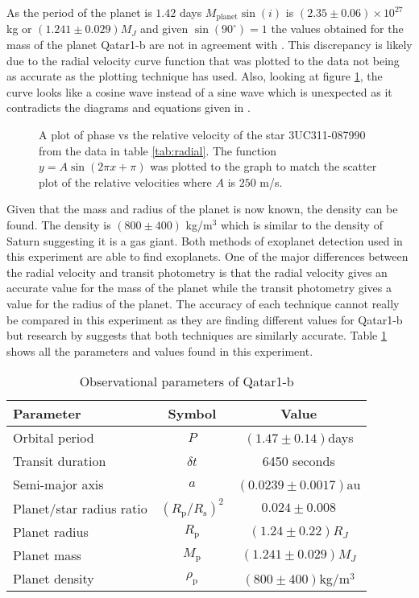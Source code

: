 \documentclass[10pt]{article}
\begin{document}
\noindent As the period of the planet is $1.42$ days \cite[p.77]{labhandbook} $M_{\text{planet}} \sin(i)$ is $(2.35\pm 0.06)\times 10^{27}$kg or $(1.241\pm 0.029)M_J$ and given $\sin(90^\circ) = 1$ the values obtained for the mass of the planet Qatar1-b are not in agreement with \cite{Alsubai_2011}. This discrepancy is likely due to the radial velocity curve function that was plotted to the data not being as accurate as the plotting technique \cite{Alsubai_2011} has used. Also, looking at figure \ref{fig:radial}, the curve looks like a cosine wave instead of a sine wave which is unexpected as it contradicts the diagrams and equations given in \cite[p.74,p.77]{labhandbook}.


\begin{figure}[!htb]
	\centering
	
	\caption{A plot of phase vs the relative velocity of the star 3UC311-087990 from the data in table \ref{tab:radial}. The function $y = A \sin(2 \pi x + \pi)$ was plotted to the graph to match the scatter plot of the relative velocities where $A$ is $250$ m/s.}
	\label{fig:radial}
\end{figure}

\noindent Given that the mass and radius of the planet is now known, the density can be found. The density is $(800\pm 400)$ kg/m$^3$ which is similar to the density of Saturn \cite{density} suggesting it is a gas giant. Both methods of exoplanet detection used in this experiment are able to find exoplanets. One of the major differences between the radial velocity and transit photometry is that the radial velocity gives an accurate value for the mass of the planet while the transit photometry gives a value for the radius of the planet. The accuracy of each technique cannot really be compared in this experiment as they are finding different values for Qatar1-b but research by \cite{Burke_2014} suggests that both techniques are similarly accurate. Table \ref{tab:para} shows all the parameters and values found in this experiment.

\begin{table}[!htb]
	\centering
	\caption{Observational parameters of Qatar1-b}
	\begin{tabular}{lcc}
		\toprule
		Parameter & Symbol & Value \\
		\midrule
		Orbital period & $P$ & $(1.47\pm 0.14)$days\\
		Transit duration & $\delta t$ & 6450 seconds \\
		Semi-major axis & $a$ & $(0.0239 \pm 0.0017)$au \\
		Planet/star radius ratio & $(R_{\text{p}}/R_{\text{s}})^2$ & $0.024\pm 0.008$ \\
		Planet radius & $R_{\text{p}}$ & $(1.24\pm 0.22)R_J$ \\
		Planet mass & $M_{\text{p}}$ & $(1.241\pm 0.029)M_J$ \\ 
		Planet density & $\rho_{\text{p}}$ & $(800\pm 400)$kg/m$^3$ \\
		\bottomrule
	\end{tabular}
	\label{tab:para}
\end{table}
\end{document}
